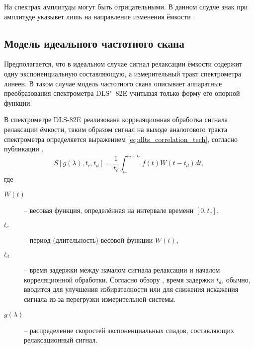     На спектрах амплитуды могут быть отрицательными. В данном слудче знак при
    амплитуде указывет лишь на направление изменения ёмкости \cite{rp_vak}.


    \subsection{Модель идеального частотного скана}
    Предполагается, что в идеальном случае сигнал релаксации ёмкости содержит 
    одну экспоненциальную составляющую, а измерительный тракт спектрометра
    линеен. В таком случае модель частотного скана описывает аппаратные 
    преобразования спектрометра DLS"~82E учитывая только форму его опорной
    функции.

    В спектрометре DLS-82E реализована корреляционная обработка сигнала
    релаксации ёмкости, таким образом сигнал на выходе аналогового тракта
    спектрометра определяется выражением \ref{eq:dlts_correlation_tech},
    согласно публикации \cite{istratov_exp_analysis}.
    \begin{equation}
        \label{eq:dlts_correlation_tech}
        S\left[g(\lambda),t_c,t_d\right]=\frac{1}{t_c}\int_{t_d}^{t_d+t_c}
        f(t)W\left(t-t_d\right)dt ,
    \end{equation}
    где
    \begin{description}
        \item[$W(t)$] -- весовая функция, определённая на интервале 
        времени $\left[0,t_c\right]$,
        \item[$t_c$] -- период (длительность) весовой функции $W(t)$,
        \item[$t_d$] -- время задержки между началом сигнала релаксации
        и началом корреляционной обработки. Согласно обзору 
        \cite{istratov_exp_analysis}, время задержки $t_d$, обычно, 
        вводится для улучшения избирателности или для снижения искажения
        сигнала из-за перегрузки измерительной системы.
        \item[$g(\lambda)$] -- распределение скоростей экспоненциальных
        спадов, составляющих релаксационный сигнал.
    \end{description}

